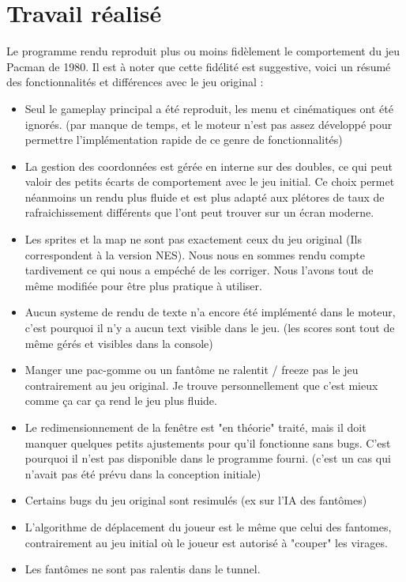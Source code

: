 \documentclass [twoside,a4paper,11pt,french] {report}
\begin{document}
\cleardoublepage


\chapter{Travail réalisé}
    Le programme rendu reproduit plus ou moins fidèlement le comportement du jeu Pacman de 1980.
    Il est à noter que cette fidélité est suggestive, voici un résumé des fonctionnalités et
    différences avec le jeu original :
    \begin{itemize}
        \item Seul le gameplay principal a été reproduit, les menu et cinématiques ont été ignorés. 
        (par manque de temps, et le moteur n'est pas assez développé pour permettre l'implémentation
        rapide de ce genre de fonctionnalités)
        \item La gestion des coordonnées est gérée en interne sur des doubles, ce qui peut valoir des petits 
        écarts de comportement avec le jeu initial. Ce choix permet néanmoins un rendu plus fluide et est plus
        adapté aux plétores de taux de rafraichissement différents que l'ont peut trouver sur un écran moderne.
        \item Les sprites et la map ne sont pas exactement ceux du jeu original (Ils correspondent à la version NES).
        Nous nous en sommes rendu compte tardivement ce qui nous a empéché de les corriger. 
        Nous l'avons tout de même modifiée pour être plus pratique à utiliser.
        \item Aucun systeme de rendu de texte n'a encore été implémenté dans le moteur, c'est pourquoi il n'y a aucun
        text visible dans le jeu. (les scores sont tout de même gérés et visibles dans la console)
        \item Manger une pac-gomme ou un fantôme ne ralentit / freeze pas le jeu contrairement au jeu original.
        Je trouve personnellement que c'est mieux comme ça car ça rend le jeu plus fluide.
        \item Le redimensionnement de la fenêtre est "en théorie" traité, mais il doit manquer quelques petits
        ajustements pour qu'il fonctionne sans bugs. C'est pourquoi il n'est pas disponible dans le programme fourni.
        (c'est un cas qui n'avait pas été prévu dans la conception initiale)
        \item Certains bugs du jeu original sont resimulés (ex sur l'IA des fantômes)
        \item L'algorithme de déplacement du joueur est le même que celui des fantomes, contrairement au jeu initial
        où le joueur est autorisé à "couper" les virages.
        \item Les fantômes ne sont pas ralentis dans le tunnel.
    \end{itemize}
\end{document}
